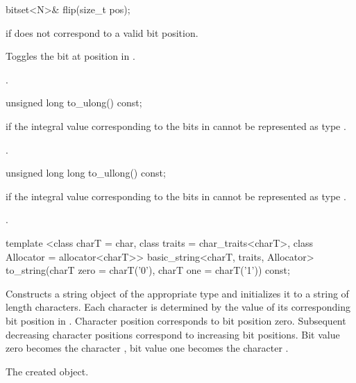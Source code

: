 %
\begin{itemdecl}
bitset<N>& flip(size_t pos);
\end{itemdecl}

\begin{itemdescr}
\pnum
\throws
{}
if  does not correspond to a valid bit position.%

\pnum
\effects
Toggles the bit at position  in
.

\pnum
\returns
{}.
\end{itemdescr}

%
\begin{itemdecl}
unsigned long to_ulong() const;
\end{itemdecl}

\begin{itemdescr}
\pnum
\throws
{}%
if the integral value  corresponding to the bits in
cannot be represented as type
.

\pnum
\returns
{}.
\end{itemdescr}

%
\begin{itemdecl}
unsigned long long to_ullong() const;
\end{itemdecl}

\begin{itemdescr}
\pnum
{}%
\throws
{}
if the integral value  corresponding to the bits in
cannot be represented as type
.

\pnum
\returns
{}.
\end{itemdescr}

%
\begin{itemdecl}
template <class charT = char,
          class traits = char_traits<charT>,
          class Allocator = allocator<charT>>
  basic_string<charT, traits, Allocator>
    to_string(charT zero = charT('0'), charT one = charT('1')) const;
\end{itemdecl}

\begin{itemdescr}
\pnum
\effects
Constructs a string object of the appropriate type
and initializes it to a string of length  characters.
Each character is determined by the value of its corresponding bit position in
.
Character position  corresponds to bit position zero.
Subsequent decreasing character positions correspond to increasing bit
positions.
Bit value zero becomes the character ,
bit value one becomes the character
.

\pnum
\returns
The created object.
\end{itemdescr}

